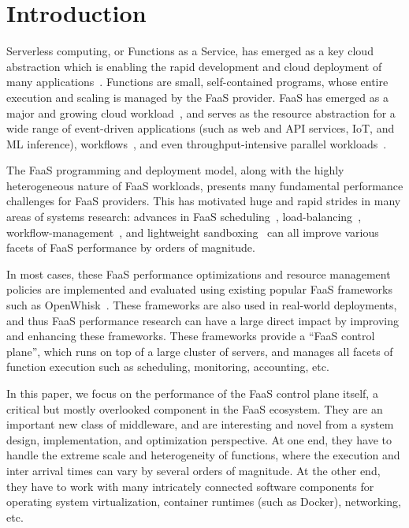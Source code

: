 \section{Introduction}


Serverless computing, or Functions as a Service, has emerged as a key cloud abstraction which is enabling the rapid development and cloud deployment of many applications~\cite{serverless-cacm-21, castro2019rise, adzic2017serverless}. 
Functions are small, self-contained programs, whose entire execution and scaling is managed by the FaaS provider. 
FaaS has emerged as a major and growing cloud workload~\cite{shahrad_serverless_2020}, and serves as the resource abstraction for a wide range of event-driven applications (such as web and API services, IoT, and ML inference), workflows~\cite{funcx_hpdc_20, mahgoub_wisefuse_2022}, and even throughput-intensive parallel workloads~\cite{xu2021lambda,carreira_cirrus_2019,fouladi_laptop_2019, fouladi2017encoding}.


The FaaS programming and deployment model, along with the highly heterogeneous nature of FaaS workloads, presents many fundamental performance challenges for FaaS providers.
This has motivated huge and rapid strides in many areas of systems research: advances in FaaS scheduling~\cite{ensure-faas-acsos20}, load-balancing~\cite{faaslb-hpdc22}, workflow-management~\cite{roy2022mashup}, and lightweight sandboxing~\cite{du2020catalyzer} can all improve various facets of FaaS performance by orders of magnitude.
%

In most cases, these FaaS performance optimizations and resource management policies are implemented and evaluated using existing popular FaaS frameworks such as OpenWhisk~\cite{openwhisk}. 
These frameworks are also used in real-world deployments, and thus FaaS performance research can have a large direct impact by improving and enhancing these frameworks. 
These frameworks provide a ``FaaS control plane'', which runs on top of a large cluster of servers, and manages all facets of function execution such as scheduling, monitoring,  accounting, etc.  


In this paper, we focus on the performance of the FaaS control plane itself, a critical but mostly overlooked component in the FaaS ecosystem.
They are an important new class of middleware, and are interesting and novel from a system design, implementation, and optimization perspective. 
At one end, they have to handle the extreme scale and heterogeneity of functions, where the execution and inter arrival times can vary by several orders of magnitude.
At the other end, they have to work with many intricately connected software components for operating system virtualization, container runtimes (such as Docker), networking, etc.


